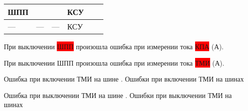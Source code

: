\begin{longtable}{|C{19mm}|C{30mm}|C{29mm}|C{19mm}|C{29mm}|C{28mm}|}
		ШПП &  &   & КСУ&  &   \tabularnewline \hline
			--- & --- & --- & КСУ&  &   \tabularnewline \hline
	
	\end{longtable}
	\vspace{-0.8em}
	
			При выключении \colorbox{red}{ШПП} произошла ошибка при измерении тока \colorbox{red}{КПА}  (А).
		
		
			При выключении ШПП произошла ошибка при измерении тока \colorbox{red}{ТМИ}  (А).
			

			Ошибка при включении ТМИ на шине \colorbox{red}{}.
			Ошибки при включении ТМИ на шинах 
			\colorbox{red}{}
		
			Ошибка при выключении ТМИ на шине \colorbox{red}{}.
			Ошибки при выключении ТМИ на шинах 
			\colorbox{red}{}
		
